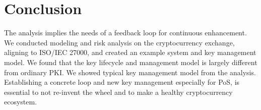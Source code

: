 \section{Conclusion}
The analysis implies the needs of a feedback loop for continuous enhancement. We conducted modeling and risk analysis on the cryptocurrency exchange, aligning to ISO/IEC 27000, and created an example system and key management model. We found that the key lifecycle and management model is largely different from ordinary PKI. We showed typical key management model from the analysis. Establishing a concrete loop and new key management especially for PoS, is essential to not re-invent the wheel and to make a healthy cryptocurrency ecosystem.
